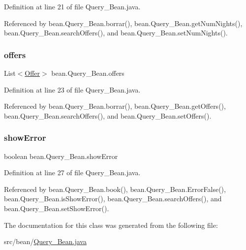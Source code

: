 Definition at line 21 of file Query\+\_\+\+Bean.\+java.



Referenced by bean.\+Query\+\_\+\+Bean.\+borrar(), bean.\+Query\+\_\+\+Bean.\+get\+Num\+Nights(), bean.\+Query\+\_\+\+Bean.\+search\+Offers(), and bean.\+Query\+\_\+\+Bean.\+set\+Num\+Nights().

\mbox{\label{classbean_1_1Query__Bean_ab994c486fce1a6f2f3fa9a7b333187ba}} 
\subsubsection{\texorpdfstring{offers}{offers}}
{\footnotesize\ttfamily List$<$\mbox{\hyperlink{classdomain_1_1Offer}{Offer}}$>$ bean.\+Query\+\_\+\+Bean.\+offers\hspace{0.3cm}{\ttfamily [package]}}



Definition at line 23 of file Query\+\_\+\+Bean.\+java.



Referenced by bean.\+Query\+\_\+\+Bean.\+borrar(), bean.\+Query\+\_\+\+Bean.\+get\+Offers(), bean.\+Query\+\_\+\+Bean.\+search\+Offers(), and bean.\+Query\+\_\+\+Bean.\+set\+Offers().

\mbox{\label{classbean_1_1Query__Bean_a7334f280df18d4e790c5a086b8334a0f}} 
\subsubsection{\texorpdfstring{showError}{showError}}
{\footnotesize\ttfamily boolean bean.\+Query\+\_\+\+Bean.\+show\+Error\hspace{0.3cm}{\ttfamily [package]}}



Definition at line 27 of file Query\+\_\+\+Bean.\+java.



Referenced by bean.\+Query\+\_\+\+Bean.\+book(), bean.\+Query\+\_\+\+Bean.\+Error\+False(), bean.\+Query\+\_\+\+Bean.\+is\+Show\+Error(), bean.\+Query\+\_\+\+Bean.\+search\+Offers(), and bean.\+Query\+\_\+\+Bean.\+set\+Show\+Error().



The documentation for this class was generated from the following file\+:\begin{DoxyCompactItemize}
\item 
src/bean/\mbox{\hyperlink{Query__Bean_8java}{Query\+\_\+\+Bean.\+java}}\end{DoxyCompactItemize}
